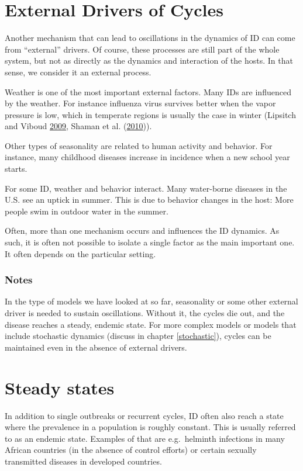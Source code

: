 \documentclass[]{book}
\theoremstyle{definition}
\theoremstyle{definition}
\theoremstyle{definition}
\theoremstyle{remark}
\begin{document}
\section{External Drivers of Cycles}\label{external-drivers-of-cycles}

Another mechanism that can lead to oscillations in the dynamics of ID
can come from ``external'' drivers. Of course, these processes are still
part of the whole system, but not as directly as the dynamics and
interaction of the hosts. In that sense, we consider it an external
process.

Weather is one of the most important external factors. Many IDs are
influenced by the weather. For instance influenza virus survives better
when the vapor pressure is low, which in temperate regions is usually
the case in winter (Lipsitch and Viboud
\protect\hyperlink{ref-lipsitch09}{2009}, Shaman et al.
(\protect\hyperlink{ref-shaman10}{2010})).

Other types of seasonality are related to human activity and behavior.
For instance, many childhood diseases increase in incidence when a new
school year starts.

For some ID, weather and behavior interact. Many water-borne diseases in
the U.S. see an uptick in summer. This is due to behavior changes in the
host: More people swim in outdoor water in the summer.

Often, more than one mechanism occurs and influences the ID dynamics. As
such, it is often not possible to isolate a single factor as the main
important one. It often depends on the particular setting.

\subsubsection{Notes}\label{mynotebox}

In the type of models we have looked at so far, seasonality or some
other external driver is needed to sustain oscillations. Without it, the
cycles die out, and the disease reaches a steady, endemic state. For
more complex models or models that include stochastic dynamics (discuss
in chapter \ref{stochastic}), cycles can be maintained even in the
absence of external drivers.

\section{Steady states}\label{steady-states}

In addition to single outbreaks or recurrent cycles, ID often also reach
a state where the prevalence in a population is roughly constant. This
is usually referred to as an endemic state. Examples of that are
e.g.~helminth infections in many African countries (in the absence of
control efforts) or certain sexually transmitted diseases in developed
countries.
\end{document}
